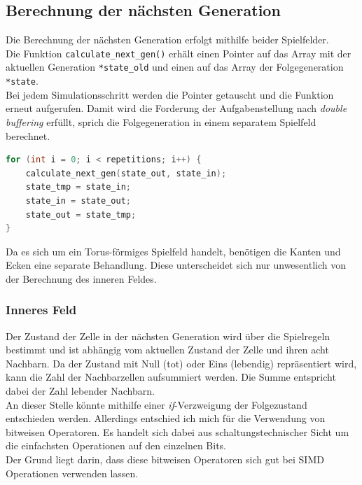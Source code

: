 \documentclass[german,plainarticle,hyperref,utf8]{zihpub}
\begin{document}
	\subsection{Berechnung der nächsten Generation}
	Die Berechnung der nächsten Generation erfolgt mithilfe beider Spielfelder.\\ Die Funktion \texttt{calculate\_next\_gen()} erhält einen Pointer auf das Array mit der aktuellen Generation \texttt{*state\_old} und einen auf das Array der Folgegeneration \texttt{*state}.\\
	Bei jedem Simulationsschritt werden die Pointer getauscht und die Funktion erneut aufgerufen. Damit wird die Forderung der Aufgabenstellung nach \textit{double buffering} erfüllt, sprich die Folgegeneration in einem separatem Spielfeld berechnet.
	\begin{lstlisting}[language=C, caption=Vertauschen der Pointer vor jedem Funktionsaufruf (vereinfacht)]
for (int i = 0; i < repetitions; i++) {
	calculate_next_gen(state_out, state_in);
	state_tmp = state_in;
	state_in = state_out;
	state_out = state_tmp;
}\end{lstlisting}
	Da es sich um ein Torus-förmiges Spielfeld handelt, benötigen die Kanten und Ecken eine separate Behandlung. Diese unterscheidet sich nur unwesentlich von der Berechnung des inneren Feldes.
	
	\subsubsection{Inneres Feld}
	Der Zustand der Zelle in der nächsten Generation wird über die Spielregeln bestimmt und ist abhängig vom aktuellen Zustand der Zelle und ihren acht Nachbarn. Da der Zustand mit Null (tot) oder Eins (lebendig) repräsentiert wird, kann die Zahl der Nachbarzellen aufsummiert werden. Die Summe entspricht dabei der Zahl lebender Nachbarn.\\
	An dieser Stelle könnte mithilfe einer \textit{if}-Verzweigung der Folgezustand entschieden werden. Allerdings entschied ich mich für die Verwendung von bitweisen Operatoren. Es handelt sich dabei aus schaltungstechnischer Sicht um die einfachsten Operationen auf den einzelnen Bits.\\
	Der Grund liegt darin, dass diese bitweisen Operatoren sich gut bei SIMD Operationen verwenden lassen.\\
	
\end{document}
